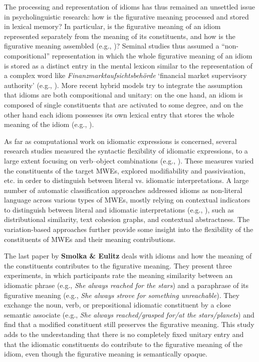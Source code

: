 \documentclass[output=paper]{langsci/langscibook}
\begin{document}
The processing and representation of idioms has thus remained an
unsettled issue in psycholinguistic research: how is the figurative
meaning processed and stored in lexical memory? In particular, is the
figurative meaning of an idiom represented separately from the meaning
of its constituents, and how is the figurative meaning assembled
(e.g., \citealt{Cacciari/Tabossi:88, Gibbs:92, Cacciari/Glucksberg:94,
  Titone/Connine:99, Hamblin/Gibbs:03})? Seminal studies thus assumed
a ``non-compositional'' representation in which the whole figurative
meaning of an idiom is stored as a distinct entry in the mental
lexicon similar to the representation of a complex word like
\textit{Finanzmarktaufsichtsbehörde} `financial market supervisory
authority' (e.g., \citealt{Bobrow/Bell:73, Swinney/Cutler:79,
  Gibbs:80}). More recent hybrid models try to integrate the
assumption that idioms are both compositional and unitary: on the one
hand, an idiom is composed of single constituents that are
activated to some degree, and on the other hand each idiom possesses
its own lexical entry that stores the whole meaning of the idiom
(e.g., \citealt{Cacciari/Tabossi:88, GibbsEtAl:89, Cutting/Bock:97,
  Titone/Connine:99, SprengerEtAl:06, Caillies/Butcher:07,
  Holsinger/Kaiser:13, Titone/Libben:14}).

As far as computational work on idiomatic expressions is concerned,
several research studies measured the syntactic flexibility of
idiomatic expressions, to a large extent focusing on verb--object
combinations (e.g., \citealt{Bannard:07,FazlyEtAl:09}). These measures
varied the constituents of the target MWEs, explored modifiability and
passivisation, etc. in order to distinguish between literal
vs. idiomatic interpretations. A large number of automatic
classification approaches addressed idioms as non-literal language across various types of MWEs, mostly relying on
contextual indicators to distinguish between literal and idiomatic
interpretations (e.g.,
\citealt{Sporleder/Li:09,TurneyEtAl:11,Koeper/SchulteImWalde:16b}),
such as distributional similarity, text cohesion graphs, and
contextual abstractness. The variation-based approaches further
provide some insight into the flexibility of the constituents of MWEs and
their meaning contributions.

The last paper by \textbf{Smolka \& Eulitz} deals with idioms and how
the meaning of the constituents contributes to the figurative meaning. They
present three experiments, in which participants rate the meaning
similarity between an idiomatic phrase (e.g., \textit{She always
  reached for the stars}) and a paraphrase of its figurative meaning
(e.g., \textit{She always strove for something unreachable}). They
exchange the noun, verb, or prepositional idiomatic constituent by a
close semantic associate (e.g., \textit{She always reached\slash grasped
  for\slash at the stars\slash planets}) and find that a modified constituent
still preserves the figurative meaning. This study adds to the
understanding that there is no completely fixed unitary entry and
that the idiomatic constituents do contribute to the figurative
meaning of the idiom, even though the figurative meaning is
semantically opaque.
\end{document}
